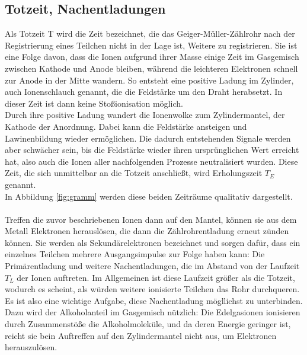 \subsection{Totzeit, Nachentladungen}
Als Totzeit T wird die Zeit bezeichnet, die das Geiger-Müller-Zählrohr nach
der Registrierung eines Teilchen nicht in der Lage ist, Weitere zu registrieren.
Sie ist eine Folge davon, dass die Ionen aufgrund ihrer Masse einige Zeit im
Gasgemisch zwischen Kathode und Anode bleiben, während die leichteren Elektronen
schnell zur Anode in der Mitte wandern. So entsteht eine positive Ladung im 
Zylinder, auch Ionenschlauch genannt, die die Feldstärke um den Draht herabsetzt.
In dieser Zeit ist dann keine Stoßionisation möglich.\\
Durch ihre positive Ladung wandert die Ionenwolke zum Zylindermantel, der Kathode
der Anordnung. Dabei kann die Feldstärke ansteigen und Lawinenbildung wieder ermöglichen.
Die dadurch entstehenden Signale werden aber schwächer sein, bis die Feldstärke
wieder ihren ursprünglichen Wert erreicht hat, also auch die Ionen aller nachfolgenden
Prozesse neutralisiert wurden. Diese Zeit, die sich unmittelbar an die Totzeit
anschließt, wird Erholungszeit $T_E$ genannt.\\
In Abbildung \ref{fig:gramm} werden diese beiden Zeiträume qualitativ dargestellt.\\
\\
Treffen die zuvor beschriebenen Ionen dann auf den Mantel, können sie aus dem
Metall Elektronen herauslösen, die dann die Zählrohrentladung erneut zünden können.
Sie werden als Sekundärelektronen bezeichnet und sorgen dafür, dass ein einzelnes
Teilchen mehrere Ausgangsimpulse zur Folge haben kann: Die Primärentladung und
weitere Nachentladungen, die im Abstand von der Laufzeit $T_L$ der Ionen 
auftreten. Im Allgemeinen ist diese Laufzeit größer als die Totzeit, wodurch es
scheint, als würden weitere ionisierte Teilchen das Rohr durchqueren.\\
Es ist also eine wichtige Aufgabe, diese Nachentladung mögllichst zu unterbinden.
Dazu wird der Alkoholanteil im Gasgemisch nützlich: Die Edelgasionen 
ionisieren durch Zusammenstöße die Alkoholmoleküle, und da deren Energie 
geringer ist, reicht sie bein Auftreffen auf den Zylindermantel nicht aus,
um Elektronen herauszulösen. 

